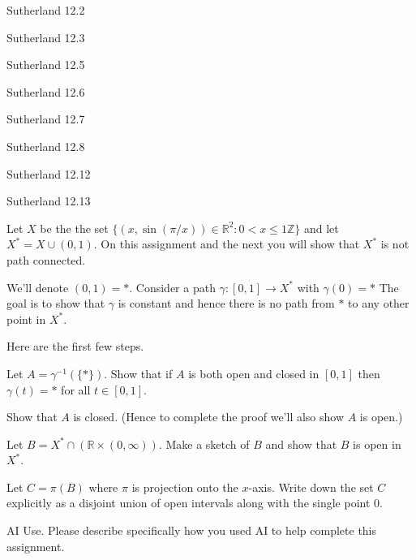 \documentclass[minion]{homework}
\newcommand{\Reals}{\ensuremath{\mathbb R}}%
\newcommand{\Ints}{\ensuremath{\mathbb Z}} %
\begin{document}
\begin{problems}

\problem Sutherland 12.2

\problem Sutherland 12.3

\problem Sutherland 12.5

\problem Sutherland 12.6

\problem Sutherland 12.7

\problem Sutherland 12.8 

\problem Sutherland 12.12

\problem Sutherland 12.13

\problem Let $X$ be the the set $\{(x,\sin(\pi/x))\in \Reals^2: 0<x\le 1\Ints\}$
and let $X^*=X\cup (0,1)$.  On this assignment and the next you will show
that $X^*$ is not path connected.

We'll denote
$(0,1)=*$.  Consider a path $\gamma:[0,1]\to X^*$ with $\gamma(0)=*$ 
The goal is to show that $\gamma$ is constant and hence there 
is no path from $*$ to any other point in $X^*$.

Here are the first few steps.

\begin{subproblems}
\item Let $A = \gamma^{-1}(\{*\})$. Show that if $A$ is both open and 
closed in $[0,1]$ then $\gamma(t)=*$ for all $t\in [0,1]$.
\item Show that $A$ is closed. (Hence to complete the proof we'll also show $A$ is open.)
\item Let $B= X^* \cap (\Reals\times (0,\infty))$. Make a sketch of $B$ and show that $B$ 
is open in $X^*$.
\item Let $C=\pi(B)$
where $\pi$ is projection onto the $x$-axis.  Write down 
the set $C$ explicitly as a disjoint union of open intervals along 
with the single point $0$.
\end{subproblems}


\problem AI Use. Please describe specifically how you used AI to help complete this assignment.

\end{problems}
\end{document}
